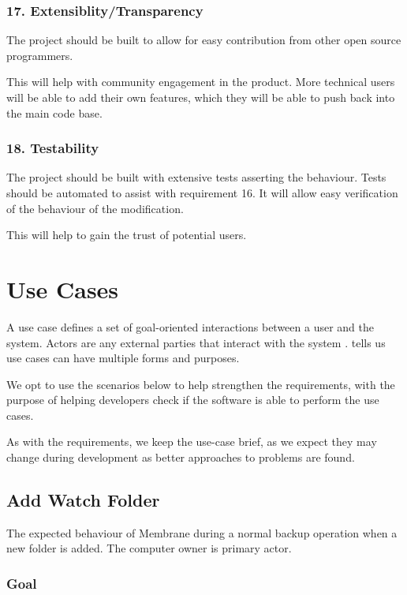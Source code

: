 \documentclass[11pt, a4paper, twocolumn, twoside]{report}
\begin{document}
\subsubsection{17. Extensiblity/Transparency}

The project should be built to allow for easy contribution from other open source programmers.

This will help with community engagement in the product. More technical users will be able to add their own features, which they will be able to push back into the main code base.

\subsubsection{18. Testability}

The project should be built with extensive tests asserting the behaviour. Tests should be automated to assist with requirement 16. It will allow easy verification of the behaviour of the modification.

This will help to gain the trust of potential users.

\clearpage

\section{Use Cases}

A use case defines a set of goal-oriented interactions between a user and the system. Actors are any external parties that interact with the system \citep{malan2001functional}. \cite{cockburn1997structuring} tells us use cases can have multiple forms and purposes.

We opt to use the scenarios below to help strengthen the requirements, with the purpose of helping developers check if the software is able to perform the use cases.

As with the requirements, we keep the use-case brief, as we expect they may change during development as better approaches to problems are found.

\subsection{Add Watch Folder}
The expected behaviour of Membrane during a normal backup operation when a new folder is added. The computer owner is primary actor.

\subsubsection{Goal}
\end{document}
